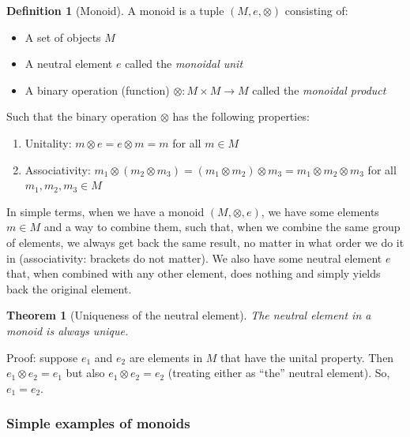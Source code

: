 \documentclass[
  openany]{book}
\providecommand{\tightlist}{%
  \setlength{\itemsep}{0pt}\setlength{\parskip}{0pt}}
\newtheorem{theorem}{Theorem}[chapter]
\theoremstyle{definition}
\newtheorem{definition}{Definition}[chapter]
\theoremstyle{definition}
\theoremstyle{definition}
\theoremstyle{definition}
\theoremstyle{remark}
\begin{document}
\begin{definition}[Monoid]

A monoid is a tuple \((M, e, \otimes)\) consisting of:

\begin{itemize}
\tightlist
\item
  A set of objects \(M\)
\item
  A neutral element \(e\) called the \emph{monoidal unit}
\item
  A binary operation (function) \(\otimes: M \times M \to M\) called the \emph{monoidal product}
\end{itemize}

Such that the binary operation \(\otimes\) has the following properties:

\begin{enumerate}
\def\labelenumi{\arabic{enumi}.}
\tightlist
\item
  Unitality: \(m \otimes e = e \otimes m = m\) for all \(m \in M\)
\item
  Associativity: \(m_1 \otimes (m_2 \otimes m_3) = (m_1 \otimes m_2) \otimes m_3 = m_1 \otimes m_2 \otimes m_3\) for all \(m_1, m_2, m_3 \in M\)
\end{enumerate}

\end{definition}

In simple terms, when we have a monoid \((M, \otimes, e)\), we have some elements \(m \in M\) and a way to combine them, such that, when we combine the same group of elements, we always get back the same result, no matter in what order we do it in (associativity: brackets do not matter). We also have some neutral element \(e\) that, when combined with any other element, does nothing and simply yields back the original element.

\begin{theorem}[Uniqueness of the neutral element]
The neutral element in a monoid is always unique.
\end{theorem}

Proof: suppose \(e_1\) and \(e_2\) are elements in \(M\) that have the unital property. Then \(e_1 \otimes e_2 = e_1\) but also \(e_1 \otimes e_2 = e_2\) (treating either as ``the'' neutral element). So, \(e_1 = e_2\).

\subsubsection{Simple examples of monoids}\label{simple-examples-of-monoids}
\end{document}
